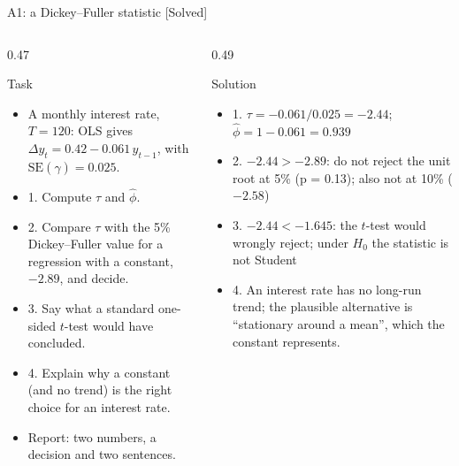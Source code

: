 \begin{frame}{A1: a Dickey--Fuller statistic [Solved]}
\itemsize{\scriptsize}
\begin{columns}[T]
\begin{column}{0.47\textwidth}
\begin{block}{Task}
\begin{itemize}
    \item A monthly interest rate, $T = 120$: OLS gives $\Delta y_t = 0.42 - 0.061\,y_{t-1}$, with $\mathrm{SE}(\hat\gamma) = 0.025$.
    \item 1. Compute $\tau$ and $\hat\phi$.
    \item 2. Compare $\tau$ with the 5\% Dickey--Fuller value for a regression with a constant, $-2.89$, and decide.
    \item 3. Say what a standard one-sided $t$-test would have concluded.
    \item 4. Explain why a constant (and no trend) is the right choice for an interest rate.
    \item Report: two numbers, a decision and two sentences.
\end{itemize}
\end{block}
\end{column}
\begin{column}{0.49\textwidth}
\begin{exampleblock}{Solution}
\begin{itemize}
    \item 1. $\tau = -0.061/0.025 = -2.44$; $\hat\phi = 1 - 0.061 = 0.939$
    \item 2. $-2.44 > -2.89$: do not reject the unit root at 5\% (p = 0.13); also not at 10\% ($-2.58$)
    \item 3. $-2.44 < -1.645$: the $t$-test would wrongly reject; under $H_0$ the statistic is not Student
    \item 4. An interest rate has no long-run trend; the plausible alternative is ``stationary around a mean'', which the constant represents.
\end{itemize}
\end{exampleblock}
\end{column}
\end{columns}
\end{frame}

